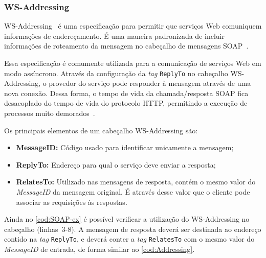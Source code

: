 \documentclass[12pt]{report} %
\begin{document}
	    \subsubsection{WS-Addressing}
		\label{section:WS-Addressing}
		WS-Addressing~\cite{wsad:website} é uma especificação para permitir que serviços Web comuniquem informações de endereçamento.
		É uma maneira padronizada de incluir informações de roteamento da mensagem no cabeçalho de mensagens SOAP~\cite{alonso2004}.
		
		Essa especificação é comumente utilizada para a comunicação de serviços Web em modo assíncrono. 
		Através da configuração da \textit{tag} \texttt{ReplyTo} no cabeçalho WS-Addressing, o provedor do serviço pode responder à mensagem através de uma nova conexão.
		Dessa forma, o tempo de vida da chamada/resposta SOAP fica desacoplado do tempo de vida do protocolo HTTP, permitindo a execução de processos muito demorados~\cite{alonso2004}.
		
		Os principais elementos de um cabeçalho WS-Addressing são:
		
		\begin{itemize}
		    \item \textbf{MessageID:} Código usado para identificar unicamente a mensagem;      
		    \item \textbf{ReplyTo:} Endereço para qual o serviço deve enviar a resposta;
		    \item \textbf{RelatesTo:} Utilizado nas mensagens de resposta, contém o mesmo valor do \textit{MessageID} da mensagem original.
		    É através desse valor que o cliente pode associar as requisições às respostas.
		\end{itemize}
		
		Ainda no \autoref{cod:SOAP-ex} é possível verificar a utilização do WS-Addressing no cabeçalho (linhas~3-8).
		A mensagem de resposta deverá ser destinada ao endereço contido na \textit{tag} \texttt{ReplyTo}, e deverá conter a \textit{tag} \texttt{RelatesTo} com o mesmo valor do \textit{MessageID} de entrada, de forma similar ao \autoref{cod:Addressing}.

		    
      
\end{document}
